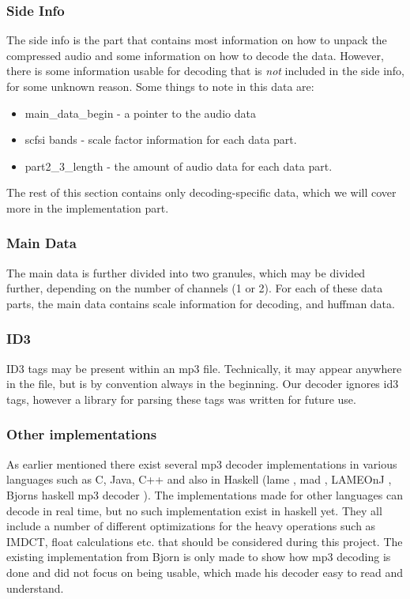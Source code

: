 \documentclass[a4paper,12pt]{article}
\begin{document}
       \subsubsection{Side Info}
            The side info is the part that contains most information on how to
            unpack the compressed audio and some information on how to decode
            the data. However, there is some information usable for decoding
            that is \textit{not} included in the side info, for some unknown
            reason. Some things to note in this data are:
            \begin{itemize}
                \item main\_data\_begin - a pointer to the audio data
                \item scfsi bands - scale factor information for each data part.
                \item part2\_3\_length - the amount of audio data for each
                      data part.
            \end{itemize}
            The rest of this section contains only decoding-specific data, which
            we will cover more in the implementation part.

       \subsubsection{Main Data}
            The main data is further divided into two granules, which may be
            divided further, depending on the number of channels (1 or 2). For
            each of these data parts, the main data contains scale information
            for decoding, and huffman data.

        \subsubsection{ID3}
            ID3 tags may be present within an mp3 file. Technically, it may
            appear anywhere in the file, but is by convention always in the
            beginning. Our decoder ignores id3 tags, however a library for
            parsing these tags was written for future use.

       \subsubsection{Other implementations}
           As earlier mentioned there exist several mp3 decoder
           implementations in various languages such as C, Java, C++
           and also in Haskell (lame \cite{lame}, mad \cite{mad},
           LAMEOnJ \cite{lameonj}, Bjorns haskell mp3
           decoder \cite{bjorn}). The implementations made for other languages can
           decode in real time, but no such implementation exist in
           haskell yet. They all include a number of different
           optimizations for the heavy operations such as IMDCT,
           float calculations etc. that should be considered during
           this project. The existing implementation from Bjorn is
           only made to show how mp3 decoding is done and did not
           focus on being usable, which made his decoder easy to read
           and understand.
\end{document}
